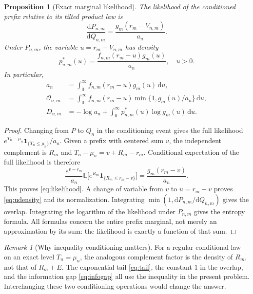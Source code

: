\documentclass[11pt,a4paper]{article}
\numberwithin{equation}{section}
\newtheorem{proposition}[theorem]{Proposition}
\theoremstyle{definition}
\theoremstyle{remark}
\newtheorem{remark}[theorem]{Remark}
\newcommand{\E}{\mathbb E}
\newcommand{\ind}{\mathbf 1}
\newcommand{\ov}{\mathcal O}
\newcommand{\dd}{\mathrm d}
\begin{document}
\begin{proposition}[Exact marginal likelihood]\label{prop:likelihood}
The likelihood of the conditioned prefix relative to its tilted product
law is
\begin{equation}\label{eq:likelihood}
\frac{\dd P_{n,m}}{\dd Q_{n,m}}
 =\frac{g_m(r_m-V_{n,m})}{a_n}.
\end{equation}
Under $P_{n,m}$, the variable $u=r_m-V_{n,m}$ has density
\begin{equation}\label{eq:udensity}
p^*_{n,m}(u)=\frac{f_{n,m}(r_m-u)g_m(u)}{a_n},\quad u>0.
\end{equation}
In particular,
\begin{align}
a_n&=\int_0^\infty f_{n,m}(r_m-u)g_m(u)\,\dd u,
\label{eq:aintegral}\\
\ov_{n,m}&=\int_0^\infty f_{n,m}(r_m-u)
                  \min\{1,g_m(u)/a_n\}\,\dd u,
\label{eq:overlapexact}\\
D_{n,m}&=-\log a_n+
 \int_0^\infty p^*_{n,m}(u)\log g_m(u)\,\dd u.
\label{eq:entropyexact}
\end{align}
\end{proposition}
\begin{proof}
Changing from $P$ to $Q_n$ in the conditioning event gives the full
likelihood $e^{T_n-\mu_n}\ind_{\{T_n\le\mu_n\}}/a_n$.
Given a prefix with centered sum $v$, the independent complement is $R_m$
and $T_n-\mu_n=v+R_m-r_m$. Conditional expectation of the full likelihood
is therefore
\[
\frac{e^{v-r_m}}{a_n}
  \E\bigl[e^{R_m}\ind_{\{R_m\le r_m-v\}}\bigr]
 =\frac{g_m(r_m-v)}{a_n}.
\]
This proves \eqref{eq:likelihood}. A change of variable from $v$ to
$u=r_m-v$ proves \eqref{eq:udensity} and its normalization. Integrating
$\min(1,\dd P_{n,m}/\dd Q_{n,m})$ gives the overlap. Integrating the
logarithm of the likelihood under $P_{n,m}$ gives the entropy formula.
All formulas concern the entire prefix marginal, not merely an
approximation by its sum: the likelihood is exactly a function of that sum.
\end{proof}

\begin{remark}[Why inequality conditioning matters]
For a regular conditional law on an exact level $T_n=\mu_n$, the analogous
complement factor is the density of $R_m$, not that of $R_m+E$. The
exponential tail \eqref{eq:tail}, the constant $1$ in the overlap, and
the information gap \eqref{eq:infogap} all use the inequality in the
present problem. Interchanging these two conditioning operations would
change the answer.
\end{remark}
\end{document}
